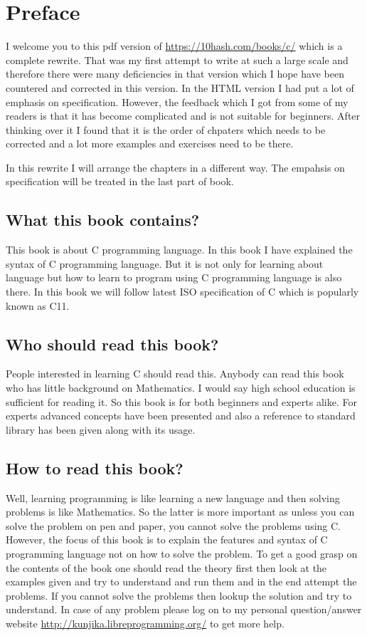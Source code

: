 \chapter{Preface}
I welcome you to this pdf version of 
\url{https://10hash.com/books/c/} which is a complete rewrite. That 
was my first attempt to write at such a large scale and therefore there were 
many deficiencies in that version which I hope have been countered and
corrected in this version. In the HTML version I had put a lot of emphasis on 
specification. However, the feedback which I got from some of my readers is 
that it has become complicated and is not suitable for beginners. After 
thinking over it I found that it is the order of chpaters which needs to be 
corrected and a lot more examples and exercises need to be there.

In this rewrite I will arrange the chapters in a different way. The empahsis on 
specification will be treated in the last part of book.

\section*{What this book contains?}
This book is about C programming language. In this book I have explained the
syntax of C programming language. But it is not only for learning about
language but how to learn to program using C programming language is also
there. In this book we will follow latest ISO specification of C which is
popularly known as C11.

\section*{Who should read this book?}
People interested in learning C should read this. Anybody can read this book
who has little background on Mathematics. I would say high school education is
sufficient for reading it. So this book is for both beginners and experts
alike. For experts advanced concepts have been presented and also a reference
to standard library has been given along with its usage.

\section*{How to read this book?}
Well, learning programming is like learning a new language and then solving
problems is like Mathematics. So the latter is more important as unless you can
solve the problem on pen and paper, you cannot solve the problems using
C. However, the focus of this book is to explain the features and syntax of C
programming language not on how to solve the problem. To get a good grasp
on the contents of the book one should read the theory first then look at the
examples given and try to understand and run them and in the end attempt
the problems. If you cannot solve the problems then lookup the solution and
try to understand. In case of any problem please log on to my personal
question/answer website \url{http://kunjika.libreprogramming.org/} to get
more help.

